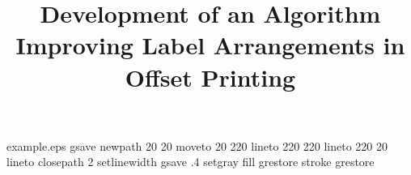 %
%
%
%
%
\begin{filecontents*}{example.eps}
gsave
newpath
  20 20 moveto
  20 220 lineto
  220 220 lineto
  220 20 lineto
closepath
2 setlinewidth
gsave
  .4 setgray fill
grestore
stroke
grestore
\end{filecontents*}
%
\RequirePackage{fix-cm}
%
\documentclass[smallextended]{svjour3}       %
%
\smartqed  %
%
\usepackage{enumerate}
\usepackage{cite}
\usepackage{array,arydshln}
\usepackage[pdftex]{graphicx}
\usepackage{rotating}
\usepackage{ifpdf}
\usepackage[all]{xy}
\usepackage{latexsym}
\usepackage[hidelinks]{hyperref}
\usepackage{color}
\usepackage{wrapfig}
\usepackage{caption}
%
\usepackage{mathptmx}      %
%
%
%
%


\title{Development of an Algorithm Improving Label Arrangements in Offset Printing}


